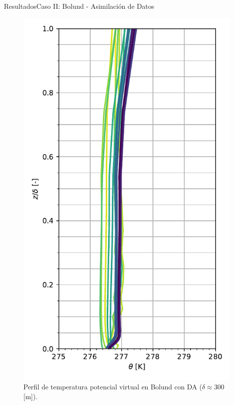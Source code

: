 \documentclass[mathserif,10pt]{beamer}
\begin{document}
\begin{frame}{Resultados}{Caso II: Bolund - Asimilación de Datos}
\begin{figure}[H]
\begin{minipage}{0.5\linewidth}
			\centering
			\includegraphics[width=0.75\linewidth,trim={0cm 5mm 0cm 0cm},clip]{fig/06/bol_da/mean_profile}%
		\end{minipage}%
		
		\caption{Perfil de temperatura potencial virtual en Bolund con DA ($\delta\approx 300$ [m]).}
		\label{fig:06_bol_da_pbl}
	\end{figure}
\end{frame}
\end{document}
